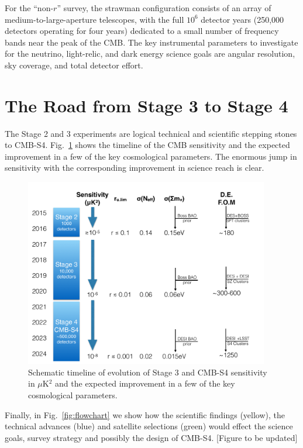 For the ``non-$r$'' survey, the strawman configuration consists of an array of medium-to-large-aperture telescopes,  with the full $10^6$ detector years (250,000 detectors operating for four years) dedicated to a small number of frequency bands near the peak of the CMB. The key instrumental parameters to investigate for the neutrino, light-relic, and dark energy science goals are angular resolution, sky coverage, and total detector effort. 

\section{The Road from Stage 3 to Stage 4}
\label{sec:context}


The Stage 2 and 3 experiments are logical technical and scientific stepping stones to CMB-S4. Fig.~\ref{fig:science_timeline-intro} shows the timeline of the CMB sensitivity and the expected improvement in a few of the key cosmological parameters. The enormous jump in sensitivity with the corresponding improvement in science reach is clear.

\begin{figure}[ht]
\centering \includegraphics[width=0.95\textwidth]{Intro/Fig-FlowChart1_v1.pdf}
\caption{Schematic timeline of evolution of Stage 3 and CMB-S4 
sensitivity in $\mu$K$^2$ and the expected improvement in a few of the key cosmological parameters.}
\label{fig:science_timeline-intro}
\end{figure}

Finally, in Fig.~\ref{fig:flowchart} we show how the scientific findings (yellow), the technical advances (blue) and satellite selections (green) would effect the science goals, survey strategy and possibly the design of CMB-S4.  [Figure to be updated]

